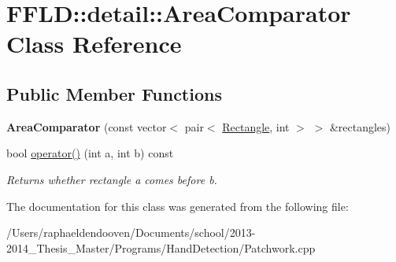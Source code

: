 \hypertarget{class_f_f_l_d_1_1detail_1_1_area_comparator}{\section{F\-F\-L\-D\-:\-:detail\-:\-:Area\-Comparator Class Reference}
\label{class_f_f_l_d_1_1detail_1_1_area_comparator}
}
\subsection*{Public Member Functions}
\begin{DoxyCompactItemize}
\item 
\hypertarget{class_f_f_l_d_1_1detail_1_1_area_comparator_a444ed565c52c89688649e77cd7185cda}{{\bfseries Area\-Comparator} (const vector$<$ pair$<$ \hyperlink{class_f_f_l_d_1_1_rectangle}{Rectangle}, int $>$ $>$ \&rectangles)}\label{class_f_f_l_d_1_1detail_1_1_area_comparator_a444ed565c52c89688649e77cd7185cda}

\item 
\hypertarget{class_f_f_l_d_1_1detail_1_1_area_comparator_af2d6531cc0f8d63b9dd171a3ffb9658f}{bool \hyperlink{class_f_f_l_d_1_1detail_1_1_area_comparator_af2d6531cc0f8d63b9dd171a3ffb9658f}{operator()} (int a, int b) const }\label{class_f_f_l_d_1_1detail_1_1_area_comparator_af2d6531cc0f8d63b9dd171a3ffb9658f}

\begin{DoxyCompactList}\small\item\em Returns whether rectangle {\ttfamily a} comes before {\ttfamily b}. \end{DoxyCompactList}\end{DoxyCompactItemize}


The documentation for this class was generated from the following file\-:\begin{DoxyCompactItemize}
\item 
/\-Users/raphaeldendooven/\-Documents/school/2013-\/2014\-\_\-\-Thesis\-\_\-\-Master/\-Programs/\-Hand\-Detection/Patchwork.\-cpp\end{DoxyCompactItemize}

